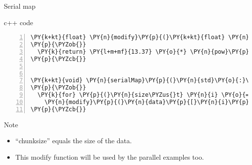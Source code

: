 \documentclass{beamer}
\begin{document}
\begin{frame}[fragile]{Serial map}

\begin{block}{c++ code}

\tiny
\begin{Verbatim}[commandchars=\\\{\},numbers=left,firstnumber=1,stepnumber=1]
\PY{k+kt}{float} \PY{n}{modify}\PY{p}{(}\PY{k+kt}{float} \PY{n}{value}\PY{p}{)}
\PY{p}{\PYZob{}}
  \PY{k}{return} \PY{l+m+mf}{13.37} \PY{o}{*} \PY{n}{pow}\PY{p}{(}\PY{n}{sqrt}\PY{p}{(}\PY{n}{value}\PY{p}{)}\PY{p}{,} \PY{n}{log}\PY{p}{(}\PY{n}{value}\PY{p}{)}\PY{p}{)}\PY{p}{;}
\PY{p}{\PYZcb{}}


\PY{k+kt}{void} \PY{n}{serialMap}\PY{p}{(}\PY{n}{std}\PY{o}{:}\PY{o}{:}\PY{n}{vector}\PY{o}{<}\PY{k+kt}{float}\PY{o}{>}\PY{o}{&} \PY{n}{data}\PY{p}{)}
\PY{p}{\PYZob{}}
  \PY{k}{for} \PY{p}{(}\PY{n}{size\PYZus{}t} \PY{n}{i} \PY{o}{=} \PY{l+m+mi}{0}\PY{p}{;} \PY{n}{i} \PY{o}{<} \PY{n}{data}\PY{p}{.}\PY{n}{size}\PY{p}{(}\PY{p}{)}\PY{p}{;} \PY{n}{i}\PY{o}{+}\PY{o}{+}\PY{p}{)}
    \PY{n}{modify}\PY{p}{(}\PY{n}{data}\PY{p}{[}\PY{n}{i}\PY{p}{]}\PY{p}{)}\PY{p}{;}
\PY{p}{\PYZcb{}}
\end{Verbatim}
\end{block}

\begin{exampleblock}{Note}
  \small
  \begin{itemize}
    \item ``chunksize'' equals the size of the data.
    \item This modify function will be used by the parallel examples too.
  \end{itemize}
\end{exampleblock}

\end{frame}

\end{document}
